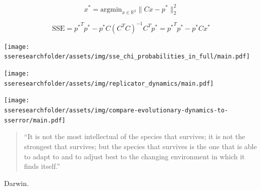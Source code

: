 \documentclass{beamer}
\newcommand{\sseresearchfolder}{$HOME/rsc/testing_for_ZD}
\begin{document}
\begin{frame}
    \Large
    \begin{equation}\label{eqn:x_star}
        x^* = \text{argmin}_{x\in\mathbb{R}^2}\|C x- p^*\|_2^2
    \end{equation}

    \begin{equation}\label{eqn:x_SSError_formula}
        \text{SSE} = {p ^ *} ^ T p ^ * -
               p ^ * C \left(C ^ T C \right) ^ {-1} C ^ T p ^ *
             = {p ^ *} ^ T p ^ * - p ^ * C x ^ *
    \end{equation}

\end{frame}

\begin{frame}
    \begin{center}
    \texttt{[image: \\sseresearchfolder/assets/img/sse\_chi\_probabilities\_in\_full/main.pdf]}
    \end{center}
\end{frame}

\begin{frame}
    \begin{center}
        \texttt{[image: \\sseresearchfolder/assets/img/replicator\_dynamics/main.pdf]}
    \end{center}
\end{frame}

\begin{frame}
    \begin{center}
    \texttt{[image: \\sseresearchfolder/assets/img/compare-evolutionary-dynamics-to-sserror/main.pdf]}
    \end{center}
\end{frame}

\begin{frame}
    \begin{table}[!hbtp]
        \begin{center}
        \tiny
        
        \end{center}
    \end{table}
\end{frame}

\begin{frame}
    \Large
    \begin{quote}
        ``It is not the most intellectual of the species that survives; it is not the
        strongest that survives; but the species that survives is the one that is able
        to adapt to and to adjust best to the changing environment in which it finds
        itself.''
    \end{quote}
    \pause
    \begin{flushright}
        Darwin.
    \end{flushright}
\end{frame}
\end{document}
